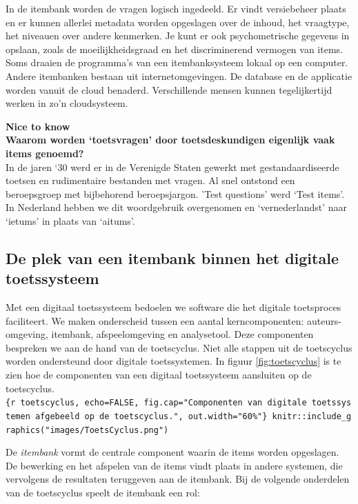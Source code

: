 \documentclass[
]{book}
\begin{document}
In de itembank worden de vragen logisch ingedeeld. Er vindt versiebeheer plaats en er kunnen allerlei metadata worden opgeslagen over de inhoud, het vraagtype, het niveauen over andere kenmerken. Je kunt er ook psychometrische gegevens in opslaan, zoals de moeilijkheidsgraad en het discriminerend vermogen van items. Soms draaien de programma's van een itembanksysteem lokaal op een computer. Andere itembanken bestaan uit internetomgevingen. De database en de applicatie worden vanuit de cloud benaderd. Verschillende mensen kunnen tegelijkertijd werken in zo'n cloudsysteem.

\textbf{Nice to know}\\
\textbf{Waarom worden `toetsvragen' door toetsdeskundigen eigenlijk vaak items genoemd?}\\
In de jaren `30 werd er in de Verenigde Staten gewerkt met gestandaardiseerde toetsen en rudimentaire bestanden met vragen. Al snel ontstond een beroepsgroep met bijbehorend beroepsjargon. 'Test questions' werd `Test items'. In Nederland hebben we dit woordgebruik overgenomen en `vernederlandst' naar `ietums' in plaats van `aitums'.

\hypertarget{de-plek-van-een-itembank-binnen-het-digitale-toetssysteem}{%
\subsection{De plek van een itembank binnen het digitale toetssysteem}\label{de-plek-van-een-itembank-binnen-het-digitale-toetssysteem}}

Met een digitaal toetssysteem bedoelen we software die het digitale toetsproces faciliteert. We maken onderscheid tussen een aantal kerncomponenten: auteurs- omgeving, itembank, afspeelomgeving en analysetool. Deze componenten bespreken we aan de hand van de toetscyclus. Niet alle stappen uit de toetscyclus worden ondersteund door digitale toetssystemen. In figuur \ref{fig:toetscyclus} is te zien hoe de componenten van een digitaal toetssysteem aansluiten op de toetscyclus.\texttt{\{r\ toetscyclus,\ echo=FALSE,\ fig.cap="Componenten\ van\ digitale\ toetssystemen\ afgebeeld\ op\ de\ toetscyclus.",\ out.width="60\%"\}\ knitr::include\_graphics("images/ToetsCyclus.png")}

De \emph{itembank} vormt de centrale component waarin de items worden opgeslagen. De bewerking en het afspelen van de items vindt plaats in andere systemen, die vervolgens de resultaten teruggeven aan de itembank. Bij de volgende onderdelen van de toetscyclus speelt de itembank een rol:
\end{document}
